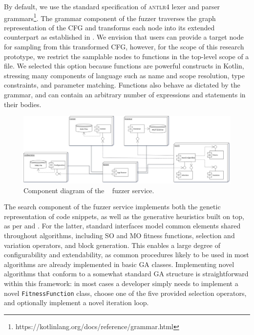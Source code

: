 By default, we use the standard specification of \textsc{antlr4}
lexer and parser grammars\footnote{https://kotlinlang.org/docs/reference/grammar.html}.
The grammar component of the fuzzer traverses the graph representation
of the \gls{CFG} and transforms each node into its extended counterpart
as established in .
We envision that users can provide a target
node for sampling from this transformed \gls{CFG},
however, for the scope of this research prototype,
we restrict the samplable nodes to functions in the top-level
scope of a file.
We selected this option because functions are powerful constructs in Kotlin,
stressing many components of language such as name and scope resolution, type constraints,
and parameter matching.
Functions also behave as dictated by the grammar, and can contain
an arbitrary number of expressions and statements in their bodies.

\begin{figure}
\includegraphics[scale=0.3]{img/components1.png}
\caption{Component diagram of the \kf~ fuzzer service.}
\label{fig:fuzzercomp}
\end{figure}

The search component of the fuzzer service implements both the genetic representation
of code snippets, as well as the generative heuristics built on top,
as per  and .
For the latter, standard interfaces model common elements
shared throughout algorithms, including 
\gls{SO} and \gls{MO} fitness functions, selection and variation operators,
and block generation.
This enables a large degree of configurability and extendability,
as common procedures likely to be used in most algorithms
are already implemented in basic \gls{GA} classes.
Implementing novel algorithms that conform to a somewhat 
standard \gls{GA} structure is straightforward within this framework:
in most cases a developer simply needs to implement a novel \texttt{FitnessFunction}
class, choose one of the five provided selection operators, and
optionally implement a novel iteration loop.

